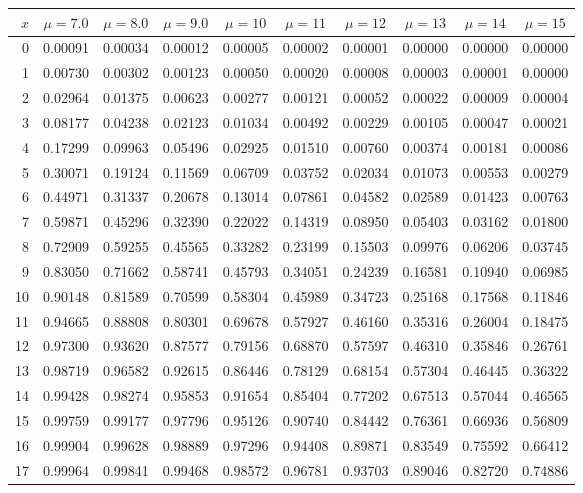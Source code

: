 \myskip
\begin{tabular}{r|*{9}{c}}
$x$ &  $\mu=7.0$  &  $\mu=8.0$  &  $\mu=9.0$  &  $\mu=10$  &  $\mu=11$
    &  $\mu=12$  &  $\mu=13$  &  $\mu=14$  &  $\mu=15$                    \\\hline
  0 & 0.00091 & 0.00034 & 0.00012 & 0.00005 & 0.00002 & 0.00001 & 0.00000 & 0.00000 & 0.00000 \\
  1 & 0.00730 & 0.00302 & 0.00123 & 0.00050 & 0.00020 & 0.00008 & 0.00003 & 0.00001 & 0.00000 \\
  2 & 0.02964 & 0.01375 & 0.00623 & 0.00277 & 0.00121 & 0.00052 & 0.00022 & 0.00009 & 0.00004 \\
  3 & 0.08177 & 0.04238 & 0.02123 & 0.01034 & 0.00492 & 0.00229 & 0.00105 & 0.00047 & 0.00021 \\
  4 & 0.17299 & 0.09963 & 0.05496 & 0.02925 & 0.01510 & 0.00760 & 0.00374 & 0.00181 & 0.00086 \\
  5 & 0.30071 & 0.19124 & 0.11569 & 0.06709 & 0.03752 & 0.02034 & 0.01073 & 0.00553 & 0.00279 \\
  6 & 0.44971 & 0.31337 & 0.20678 & 0.13014 & 0.07861 & 0.04582 & 0.02589 & 0.01423 & 0.00763 \\
  7 & 0.59871 & 0.45296 & 0.32390 & 0.22022 & 0.14319 & 0.08950 & 0.05403 & 0.03162 & 0.01800 \\
  8 & 0.72909 & 0.59255 & 0.45565 & 0.33282 & 0.23199 & 0.15503 & 0.09976 & 0.06206 & 0.03745 \\
  9 & 0.83050 & 0.71662 & 0.58741 & 0.45793 & 0.34051 & 0.24239 & 0.16581 & 0.10940 & 0.06985 \\
 10 & 0.90148 & 0.81589 & 0.70599 & 0.58304 & 0.45989 & 0.34723 & 0.25168 & 0.17568 & 0.11846 \\
 11 & 0.94665 & 0.88808 & 0.80301 & 0.69678 & 0.57927 & 0.46160 & 0.35316 & 0.26004 & 0.18475 \\
 12 & 0.97300 & 0.93620 & 0.87577 & 0.79156 & 0.68870 & 0.57597 & 0.46310 & 0.35846 & 0.26761 \\
 13 & 0.98719 & 0.96582 & 0.92615 & 0.86446 & 0.78129 & 0.68154 & 0.57304 & 0.46445 & 0.36322 \\
 14 & 0.99428 & 0.98274 & 0.95853 & 0.91654 & 0.85404 & 0.77202 & 0.67513 & 0.57044 & 0.46565 \\
 15 & 0.99759 & 0.99177 & 0.97796 & 0.95126 & 0.90740 & 0.84442 & 0.76361 & 0.66936 & 0.56809 \\
 16 & 0.99904 & 0.99628 & 0.98889 & 0.97296 & 0.94408 & 0.89871 & 0.83549 & 0.75592 & 0.66412 \\
 17 & 0.99964 & 0.99841 & 0.99468 & 0.98572 & 0.96781 & 0.93703 & 0.89046 & 0.82720 & 0.74886 \\

\end{tabular}
